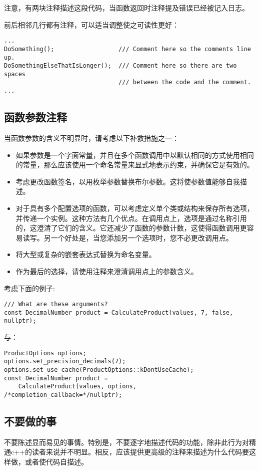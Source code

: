 注意，有两块注释描述这段代码，当函数返回时注释提及错误已经被记入日志。

前后相邻几行都有注释，可以适当调整使之可读性更好：
\begin{verbatim}
...
DoSomething();                  /// Comment here so the comments line up.
DoSomethingElseThatIsLonger();  /// Comment here so there are two spaces
                                /// between the code and the comment.
...
\end{verbatim}


\subsection{函数参数注释}
当函数参数的含义不明显时，请考虑以下补救措施之一：
\begin{itemize}
\item 如果参数是一个字面常量，并且在多个函数调用中以默认相同的方式使用相同的常量，那么应该使用一个命名常量来显式地表示约束，并确保它是有效的。
\item 考虑更改函数签名，以用枚举参数替换布尔参数。这将使参数值能够自我描述。
\item 对于具有多个配置选项的函数，可以考虑定义单个类或结构来保存所有选项，并传递一个实例。这种方法有几个优点。在调用点上，选项是通过名称引用的，这澄清了它们的含义。它还减少了函数的参数计数，这使得函数调用更容易读写。另一个好处是，当您添加另一个选项时，您不必更改调用点。
\item 将大型或复杂的嵌套表达式替换为命名变量。
\item 作为最后的选择，请使用注释来澄清调用点上的参数含义。
\end{itemize}

考虑下面的例子:
\begin{verbatim}
/// What are these arguments?
const DecimalNumber product = CalculateProduct(values, 7, false, nullptr);
\end{verbatim}
与：
\begin{verbatim}
ProductOptions options;
options.set_precision_decimals(7);
options.set_use_cache(ProductOptions::kDontUseCache);
const DecimalNumber product =
    CalculateProduct(values, options, /*completion_callback=*/nullptr);
\end{verbatim}


\subsection{不要做的事}
不要陈述显而易见的事情。特别是，不要逐字地描述代码的功能，除非此行为对精通c++的读者来说并不明显。相反，应该提供更高级的注释来描述为什么代码要这样做，或者使代码自描述。

